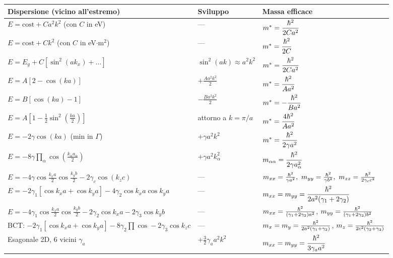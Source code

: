 \vspace{0.3cm}
\begin{center}
\renewcommand{\arraystretch}{1.7}
\begin{tabular}{l l l}
\toprule
Dispersione (vicino all'estremo) & Sviluppo & Massa efficace \\
\midrule
$E = \text{cost} + C a^2 k^2$ (con $C$ in eV) & --- & $m^*=\dfrac{\hbar^2}{2Ca^2}$ \\
$E = \text{cost} + C k^2$ (con $C$ in eV$\cdot$m$^2$) & --- & $m^*=\dfrac{\hbar^2}{2C}$ \\
$E = E_g + C\left[\sin^2(ak_x)+\dots\right]$ & $\sin^2(ak)\approx a^2k^2$ & $m^*=\dfrac{\hbar^2}{2Ca^2}$ \\
$E = A\left[2-\cos(ka)\right]$ & $+\frac{Aa^2k^2}{2}$ & $m^*=\dfrac{\hbar^2}{Aa^2}$ \\
$E = B\left[\cos(ka)-1\right]$ & $-\frac{Ba^2k^2}{2}$ & $m^*=-\dfrac{\hbar^2}{Ba^2}$ \\
$E = A\left[1-\frac12\sin^2\!\left(\frac{ka}{2}\right)\right]$ & attorno a $k=\pi/a$ & $m^*=\dfrac{4\hbar^2}{Aa^2}$ \\
$E = -2\gamma\cos(ka)$ (min in $\Gamma$) & $+\gamma a^2k^2$ & $m^*=\dfrac{\hbar^2}{2\gamma a^2}$ \\
$E = -8\gamma\prod_\alpha\cos\!\left(\frac{k_\alpha a_\alpha}{2}\right)$ & $+\gamma a^2k_\alpha^2$ & $m_{\alpha\alpha}=\dfrac{\hbar^2}{2\gamma a_\alpha^2}$ \\
$E=-4\gamma\cos\frac{k_xa}{2}\cos\frac{k_yb}{2}-2\gamma_c\cos(k_zc)$ & --- & $m_{xx}=\frac{\hbr^2}{\gamma a^2},\ m_{yy}=\frac{\hbr^2}{\gamma b^2},\ m_{zz}=\frac{\hbr^2}{2\gamma_cc^2}$ \\
$E=-2\gamma_1\!\left[\cos k_xa+\cos k_ya\right]-4\gamma_2\cos k_xa\cos k_ya$ & --- & $m_{xx}=m_{yy}=\dfrac{\hbar^2}{2a^2(\gamma_1+2\gamma_2)}$ \\
$E=-4\gamma_1\cos\frac{k_xa}{2}\cos\frac{k_yb}{2}-2\gamma_2\cos k_xa-2\gamma_3\cos k_yb$ & --- & $m_{xx}=\frac{\hbar^2}{(\gamma_1+2\gamma_2)a^2}$, $m_{yy}=\frac{\hbar^2}{(\gamma_1+2\gamma_3)b^2}$ \\
BCT: $-2\gamma_1[\cos k_xa+\cos k_ya]-8\gamma_2\prod\cos-2\gamma_3\cos k_zc$ & --- & $m_x=m_y=\frac{\hbar^2}{2a^2(\gamma_1+\gamma_2)}$, $m_z=\frac{\hbar^2}{2c^2(\gamma_2+\gamma_3)}$ \\
Esagonale 2D, 6 vicini $\gamma_a$ & $+\frac32\gamma_aa^2k^2$ & $m_{xx}=m_{yy}=\dfrac{\hbar^2}{3\gamma_aa^2}$ \\
\bottomrule
\end{tabular}
\end{center}


